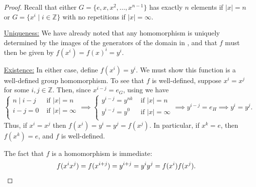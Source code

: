\documentclass[12pt]{report}
\numberwithin{equation}{section}
\numberwithin{theorem}{chapter}
\theoremstyle{definition}
\newtheorem*{basic properties}{Basic Properties}
\newtheorem*{Important Remark}{Important Remark}
\newcommand{\Z}{\mathbb{Z}}
\begin{document}
\begin{proof} 
Recall that either $G = \{e,x,x^2, \dots, x^{n-1}\}$ has exactly $n$ elements if $|x| = n$ or $G = \{ x^i \mid i \in \Z \}$ with no repetitions if $|x| = \infty$. 
  
  \vspace{0.4em}
  
  \underline{Uniqueness:} We have already noted that any homomorphism is uniquely determined by the images of the generators of the domain in , and that $f$ must then be given by $f(x^i) =f(x)^i = y^i$. 
%  
  
   \vspace{0.4em}
   
   \underline{Existence:} 
In either case, define $f(x^i) = y^i$.  We must show this function is a well-defined group homomorphism.
To see that $f$ is well-defined, suppose $x^i=x^j$ for some $i,j\in \Z$. Then, since $x^{i-j}=e_G$, using  we have
$$\begin{cases}
n\mid i-j & \text{ if } |x|=n\\
i-j=0 & \text{ if } |x|=\infty\\
\end{cases}
\implies
\begin{cases}
y^ {i-j}=y^{nk} & \text{ if } |x|=n\\
y^{i-j}=y^0 & \text{ if } |x|=\infty\\
\end{cases}
\implies y^ {i-j}=e_H
\implies y^ i=y^j.
$$
Thus, if $x^i=x^j$ then $f(x^i)=y^i=y^j=f(x^j)$. In particular, if $x^k = e$, then $f(x^k) = e$, and $f$ is well-defined.

\vspace{0.4em}

The fact that $f$ is a homomorphism is immediate: 
$$f(x^ix^j)=f(x^{i+j})=y^{i+j}=y^iy^j=f(x^i)f(x^j).\qedhere$$
\end{proof}
\end{document}

